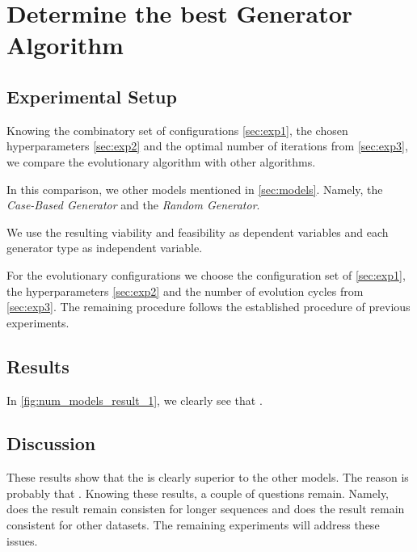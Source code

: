 \documentclass[./../../paper.tex]{subfiles}
\begin{document}
\section{Determine the best Generator Algorithm}

\subsection{Experimental Setup}
\label{sec:exp4}
Knowing the combinatory set of configurations \autoref{sec:exp1}, the chosen hyperparameters \autoref{sec:exp2} and the optimal number of iterations from \autoref{sec:exp3}, we compare the evolutionary algorithm with other algorithms. 

In this comparison, we other models mentioned in \autoref{sec:models}. Namely, the \emph{Case-Based Generator} and the \emph{Random Generator}. 

We use the resulting viability and feasibility as dependent variables and each generator type as independent variable.

For the evolutionary configurations we choose the configuration set of \autoref{sec:exp1}, the hyperparameters \autoref{sec:exp2} and the number of evolution cycles from \autoref{sec:exp3}. The remaining procedure follows the established procedure of previous experiments.

\subsection{Results}




In \autoref{fig:num_models_result_1}, we clearly see that . 

\subsection{Discussion}
These results show that the  is clearly superior to the other models. The reason is probably that . Knowing these results, a couple of questions remain. Namely, does the result remain consisten for longer sequences and does the result remain consistent for other datasets.  The remaining experiments will address these issues. 
\end{document}
